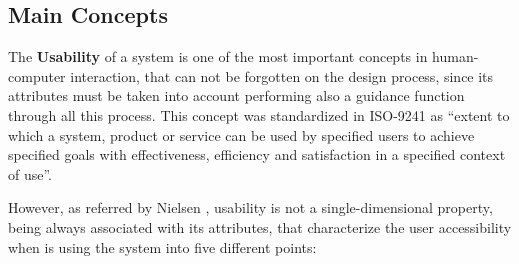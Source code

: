 \subsection{Main Concepts}
\label{subsec:main_concepts}
The \textbf{Usability} of a system is one of the most important concepts in human-computer interaction, that can not be forgotten on the design process, since its attributes must be taken into account performing also a guidance function through all this process. This concept was standardized in ISO-9241 \cite{iso9241-11_2018} as “extent to which a system, product or service can be used by specified users to achieve specified goals with effectiveness, efficiency and satisfaction in a specified context of use”.

However, as referred by Nielsen \cite{usabilityEngineering}, usability is not a single-dimensional property, being always associated with its attributes, that characterize the user accessibility when is using the system into five different points: